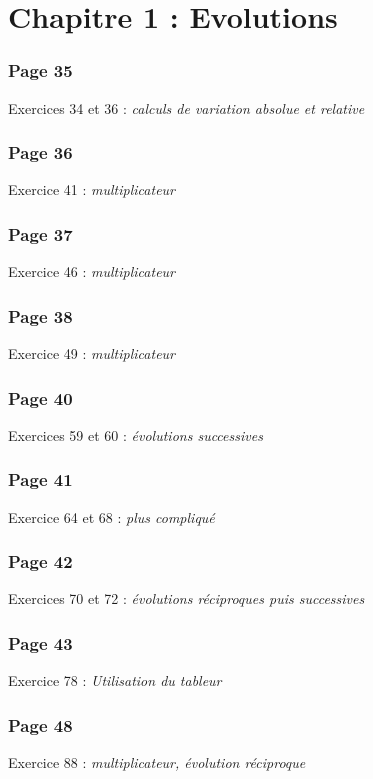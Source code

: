 \documentclass[10pt,openright,twoside,french]{book}
\begin{document}
\begin{center}
\end{center}\medskip

\section*{Chapitre 1 : Evolutions}
\subsubsection{Page 35}
Exercices 34 et 36 : \textit{calculs de variation absolue et relative}

\subsubsection{Page 36}
Exercice 41 : \textit{\coef multiplicateur}

\subsubsection{Page 37}
Exercice 46 : \textit{\coef multiplicateur}

\subsubsection{Page 38}
Exercice 49 : \textit{\coef multiplicateur}

\subsubsection{Page 40}
Exercices 59 et 60 : \textit{évolutions successives}

\subsubsection{Page 41}
Exercice 64 et 68 : \textit{plus compliqué}

\subsubsection{Page 42}
Exercices 70 et 72 : \textit{évolutions réciproques puis successives}

\subsubsection{Page 43}
Exercice 78 : \textit{Utilisation du tableur}

\subsubsection{Page 48}
Exercice 88 : \textit{\coef multiplicateur, évolution réciproque}
\end{document}
